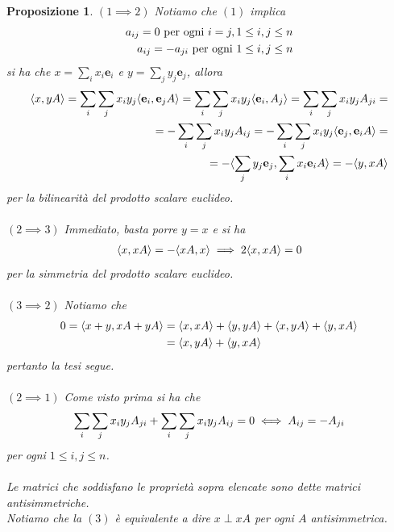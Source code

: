 \documentclass[oneside, 11pt]{amsbook}
\makeatletter
\newcommand{\0}{{(0)}}
\newcommand{\3}{{(3)}}
\theoremstyle{colonplain}
\newtheorem{prop}[thm]{Proposizione}
\theoremstyle{colondefinition}
\theoremstyle{colonremark}
\numberwithin{equation}{chapter}
\renewcommand{\proofname}{Dimostrazione}
\renewenvironment{proof}[1][\proofname]{\par
  \pushQED{\qed}%
  \normalfont \topsep6\p@\@plus6\p@\relax
  \trivlist
  \item[\hskip\labelsep\bfseries #1:]\ignorespaces
}{%
  \popQED\endtrivlist\@endpefalse
}
\makeatother
\begin{document}
\begin{prop}
\begin{proof} $(1 \implies 2)$ Notiamo che $(1)$ implica
\begin{align}
    a_{ij} = 0 \text{ per ogni } i = j, 1 \leq i, j \leq n \notag \\
    a_{ij} = - a_{ji} \text{ per ogni } 1 \leq i, j \leq n \notag
\end{align}
si ha che $x = \sum_i x_i \mathbf{e}_i$ e $y = \sum_j y_j \mathbf{e}_j$, allora
\begin{align}
    \langle x, yA \rangle = \sum_i \sum_j x_iy_j \langle \mathbf{e}_i, \mathbf{e}_jA \rangle = \sum_i \sum_j x_iy_j \langle \mathbf{e}_i, A_j \rangle \notag = \sum_i \sum_j x_iy_jA_{ji} = \notag \\
    = - \sum_i \sum_j x_iy_j A_{ij} = -\sum_i \sum_j x_iy_j \langle \mathbf{e}_j, \mathbf{e}_iA \rangle = \notag \\
    = -\langle \sum_j y_j\mathbf{e}_j, \sum_i x_i\mathbf{e}_i A \rangle = -\langle y, xA \rangle \notag
\end{align}
per la bilinearità del prodotto scalare euclideo. \\ \\
$(2 \implies 3)$ Immediato, basta porre $y = x$ e si ha
\begin{align}
    \langle x, xA \rangle = - \langle xA, x \rangle \implies 2\langle x, xA \rangle = 0 \notag
\end{align}
per la simmetria del prodotto scalare euclideo. \\ \\
$(3 \implies 2)$ Notiamo che
\begin{align}
    0 = \langle x + y, xA + yA \rangle &= \langle x, xA \rangle + \langle y, yA \rangle + \langle x, yA \rangle + \langle y, xA \rangle \notag \\
    &= \langle x, yA \rangle + \langle y, xA \rangle \notag
\end{align}
pertanto la tesi segue. \\ \\
$(2 \implies 1)$ Come visto prima si ha che
\begin{align}
    \sum_i \sum_j x_iy_j A_{ji} + \sum_i \sum_j x_iy_j A_{ij} = 0 \iff A_{ij} = -A_{ji} \notag
\end{align}
per ogni $1 \leq i, j \leq n$. \\ \\
Le matrici che soddisfano le proprietà sopra elencate sono dette \textit{matrici antisimmetriche}. \\
Notiamo che la $(3)$ è equivalente a dire $x \perp xA$ per ogni $A$ antisimmetrica. \end{proof}
\end{prop}
\end{document}
